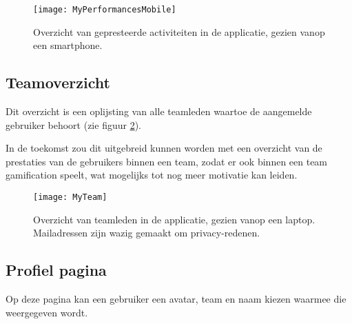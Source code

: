 \begin{figure}[h]
    \caption[Overzicht activiteiten website smartphone]{Overzicht van gepresteerde activiteiten in de applicatie, gezien vanop een smartphone.}
    \texttt{[image: MyPerformancesMobile]}
    \label{fig:performancesMobile}
\end{figure}

\subsection{Teamoverzicht}

Dit overzicht is een oplijsting van alle teamleden waartoe de aangemelde gebruiker behoort (zie figuur \ref{fig:team}).

In de toekomst zou dit uitgebreid kunnen worden met een overzicht van de prestaties van de gebruikers binnen een team, zodat er ook binnen een team gamification speelt, wat mogelijks tot nog meer motivatie kan leiden.

\begin{figure}[h]
    \caption[Overzicht van teamleden]{Overzicht van teamleden in de applicatie, gezien vanop een laptop. Mailadressen zijn wazig gemaakt om privacy-redenen.}
    \texttt{[image: MyTeam]}
    \label{fig:team}
\end{figure}

\subsection{Profiel pagina}

Op deze pagina kan een gebruiker een avatar, team en naam kiezen waarmee die weergegeven wordt.